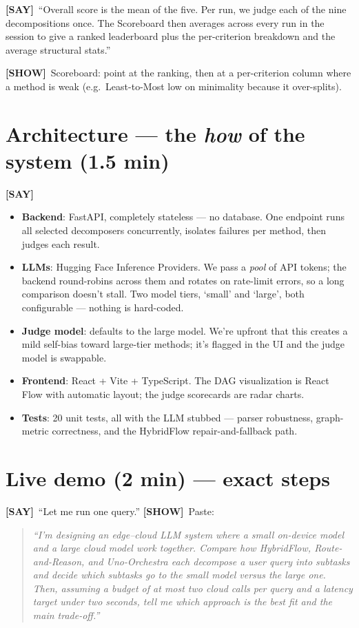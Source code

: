 \documentclass[11pt]{article}
\newcommand{\say}{\textcolor{sayc}{\textbf{[SAY]}}\ }
\newcommand{\showcue}{\textcolor{showc}{\textbf{[SHOW]}}\ }
\begin{document}
\say ``Overall score is the mean of the five. Per run, we judge each of the nine
decompositions once. The Scoreboard then averages across every run in the session
to give a ranked leaderboard plus the per-criterion breakdown and the average
structural stats.''

\showcue Scoreboard: point at the ranking, then at a per-criterion column where a
method is weak (e.g.\ Least-to-Most low on minimality because it over-splits).

\section{Architecture --- the \emph{how} of the system (1.5 min)}

\say
\begin{itemize}
  \item \textbf{Backend}: FastAPI, completely stateless --- no database. One
  endpoint runs all selected decomposers concurrently, isolates failures per
  method, then judges each result.
  \item \textbf{LLMs}: Hugging Face Inference Providers. We pass a \emph{pool} of
  API tokens; the backend round-robins across them and rotates on rate-limit
  errors, so a long comparison doesn't stall. Two model tiers, `small' and
  `large', both configurable --- nothing is hard-coded.
  \item \textbf{Judge model}: defaults to the large model. We're upfront that this
  creates a mild self-bias toward large-tier methods; it's flagged in the UI and
  the judge model is swappable.
  \item \textbf{Frontend}: React + Vite + TypeScript. The DAG visualization is
  React Flow with automatic layout; the judge scorecards are radar charts.
  \item \textbf{Tests}: 20 unit tests, all with the LLM stubbed --- parser
  robustness, graph-metric correctness, and the HybridFlow repair-and-fallback
  path.
\end{itemize}

\section{Live demo (2 min) --- exact steps}

\say ``Let me run one query.'' \showcue Paste:

\begin{quote}
\itshape
``I'm designing an edge--cloud LLM system where a small on-device model and a
large cloud model work together. Compare how HybridFlow, Route-and-Reason, and
Uno-Orchestra each decompose a user query into subtasks and decide which subtasks
go to the small model versus the large one. Then, assuming a budget of at most two
cloud calls per query and a latency target under two seconds, tell me which
approach is the best fit and the main trade-off.''
\end{quote}
\end{document}
